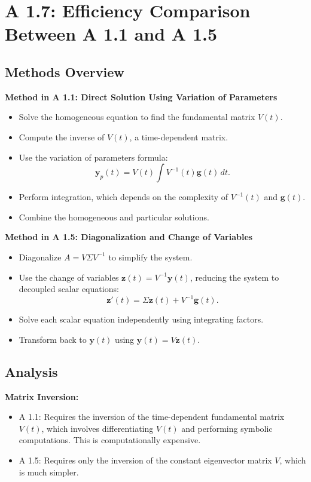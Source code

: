\documentclass[12pt]{article}
\begin{document}
\section*{A 1.7: Efficiency Comparison Between A 1.1 and A 1.5}

\subsection*{Methods Overview}
\textbf{Method in A 1.1: Direct Solution Using Variation of Parameters}
\begin{itemize}
    \item Solve the homogeneous equation to find the fundamental matrix \(V(t)\).
    \item Compute the inverse of \(V(t)\), a time-dependent matrix.
    \item Use the variation of parameters formula:
    \[
    \mathbf{y}_p(t) = V(t) \int V^{-1}(t) \mathbf{g}(t) \, dt.
    \]
    \item Perform integration, which depends on the complexity of \(V^{-1}(t)\) and \(\mathbf{g}(t)\).
    \item Combine the homogeneous and particular solutions.
\end{itemize}

\textbf{Method in A 1.5: Diagonalization and Change of Variables}
\begin{itemize}
    \item Diagonalize \(A = V\Sigma V^{-1}\) to simplify the system.
    \item Use the change of variables \(\mathbf{z}(t) = V^{-1}\mathbf{y}(t)\), reducing the system to decoupled scalar equations:
    \[
    \mathbf{z}'(t) = \Sigma\mathbf{z}(t) + V^{-1}\mathbf{g}(t).
    \]
    \item Solve each scalar equation independently using integrating factors.
    \item Transform back to \(\mathbf{y}(t)\) using \(\mathbf{y}(t) = V\mathbf{z}(t)\).
\end{itemize}

\subsection*{Analysis}
\textbf{Matrix Inversion:}
\begin{itemize}
    \item A 1.1: Requires the inversion of the time-dependent fundamental matrix \(V(t)\), which involves differentiating \(V(t)\) and performing symbolic computations. This is computationally expensive.
    \item A 1.5: Requires only the inversion of the constant eigenvector matrix \(V\), which is much simpler.
\end{itemize}
\end{document}
